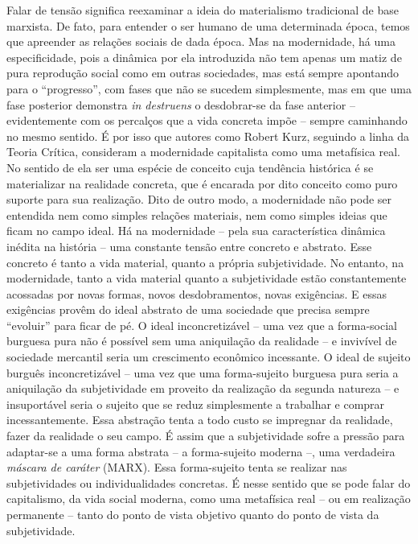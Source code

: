 Falar de tensão significa reexaminar a ideia do materialismo tradicional
de base marxista. De fato, para entender o ser humano de uma determinada
época, temos que apreender as relações sociais de dada época. Mas na
modernidade, há uma especificidade, pois a dinâmica por ela introduzida
não tem apenas um matiz de pura reprodução social como em outras
sociedades, mas está sempre apontando para o ``progresso'', com fases
que não se sucedem simplesmente, mas em que uma fase posterior demonstra
\emph{in destruens} o desdobrar-se da fase anterior -- evidentemente com
os percalços que a vida concreta impõe -- sempre caminhando no mesmo
sentido. É por isso que autores como Robert Kurz, seguindo a linha da
Teoria Crítica, consideram a modernidade capitalista como uma metafísica
real. No sentido de ela ser uma espécie de conceito cuja tendência
histórica é se materializar na realidade concreta, que é encarada por
dito conceito como puro suporte para sua realização. Dito de outro modo,
a modernidade não pode ser entendida nem como simples relações
materiais, nem como simples ideias que ficam no campo ideal. Há na
modernidade -- pela sua característica dinâmica inédita na história --
uma constante tensão entre concreto e abstrato. Esse concreto é tanto a
vida material, quanto a própria subjetividade. No entanto, na
modernidade, tanto a vida material quanto a subjetividade estão
constantemente acossadas por novas formas, novos desdobramentos, novas
exigências. E essas exigências provêm do ideal abstrato de uma sociedade
que precisa sempre ``evoluir'' para ficar de pé. O ideal inconcretizável
-- uma vez que a forma-social burguesa pura não é possível sem uma
aniquilação da realidade -- e invivível de sociedade mercantil seria um
crescimento econômico incessante. O ideal de sujeito burguês
inconcretizável -- uma vez que uma forma-sujeito burguesa pura seria a
aniquilação da subjetividade em proveito da realização da segunda
natureza -- e insuportável seria o sujeito que se reduz simplesmente a
trabalhar e comprar incessantemente. Essa abstração tenta a todo custo
se impregnar da realidade, fazer da realidade o seu campo. É assim que a
subjetividade sofre a pressão para adaptar-se a uma forma abstrata -- a
forma-sujeito moderna --, uma verdadeira \emph{máscara de caráter}
(MARX). Essa forma-sujeito tenta se realizar nas subjetividades ou
individualidades concretas. É nesse sentido que se pode falar do
capitalismo, da vida social moderna, como uma metafísica real -- ou em
realização permanente -- tanto do ponto de vista objetivo quanto do
ponto de vista da subjetividade.

